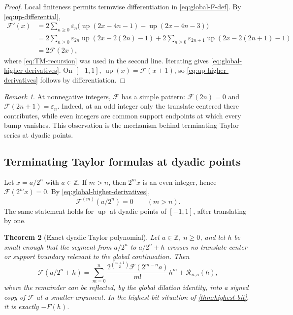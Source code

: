 \documentclass[11pt]{article}
\numberwithin{equation}{section}
\newtheorem{theorem}{Theorem}[section]
\theoremstyle{definition}
\theoremstyle{remark}
\newtheorem{remark}[theorem]{Remark}
\newcommand{\Z}{\mathbb Z}
\newcommand{\GF}{\mathcal F}
\newcommand{\upf}{\operatorname{up}}
\newcommand{\eps}{\varepsilon}
\begin{document}
\begin{proof}
Local finiteness permits termwise differentiation in \eqref{eq:global-F-def}.  By \eqref{eq:up-differential},
\begin{align*}
 \GF'(x)
 &=2\sum_{n\ge0}\eps_n\bigl(\upf(2x-4n-1)-\upf(2x-4n-3)\bigr)\\
 &=2\sum_{n\ge0}\eps_{2n}\upf(2x-2(2n)-1)
   +2\sum_{n\ge0}\eps_{2n+1}\upf(2x-2(2n+1)-1)\\
 &=2\GF(2x),
\end{align*}
where \eqref{eq:TM-recursion} was used in the second line.  Iterating gives \eqref{eq:global-higher-derivatives}.  On $[-1,1]$, $\upf(x)=\GF(x+1)$, so \eqref{eq:up-higher-derivatives} follows by differentiation.
\end{proof}

\begin{remark}
At nonnegative integers, $\GF$ has a simple pattern: $\GF(2n)=0$ and $\GF(2n+1)=\eps_n$.  Indeed, at an odd integer only the translate centered there contributes, while even integers are common support endpoints at which every bump vanishes.  This observation is the mechanism behind terminating Taylor series at dyadic points.
\end{remark}

\subsection{Terminating Taylor formulas at dyadic points}

Let $x=a/2^n$ with $a\in\Z$.  If $m>n$, then $2^m x$ is an even integer, hence $\GF(2^m x)=0$.  By \eqref{eq:global-higher-derivatives},
\begin{equation}\label{eq:dyadic-derivative-vanishing}
 \GF^{(m)}(a/2^n)=0\qquad(m>n).
\end{equation}
The same statement holds for $\upf$ at dyadic points of $[-1,1]$, after translating by one.

\begin{theorem}[Exact dyadic Taylor polynomial]\label{thm:dyadic-Taylor}
Let $a\in\Z$, $n\ge0$, and let $h$ be small enough that the segment from $a/2^n$ to $a/2^n+h$ crosses no translate center or support boundary relevant to the global continuation.  Then
\begin{equation}\label{eq:dyadic-Taylor}
 \GF(a/2^n+h)=
 \sum_{m=0}^{n}\frac{2^{\binom{m+1}{2}}\GF(2^{m-n}a)}{m!}h^m
 +\mathcal R_{n,a}(h),
\end{equation}
where the remainder can be reflected, by the global dilation identity, into a signed copy of $\GF$ at a smaller argument.  In the highest-bit situation of \cref{thm:highest-bit}, it is exactly $-F(h)$.
\end{theorem}
\end{document}
